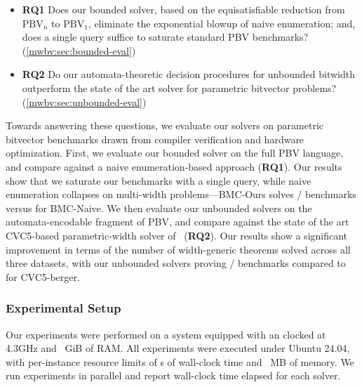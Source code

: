 \begin{itemize}[leftmargin=*]
  \item \textbf{RQ1} Does our bounded solver, based on the equisatisfiable reduction from $\text{PBV}_n$ to $\text{PBV}_1$, eliminate the exponential blowup of
naive enumeration; and, does a single \qfbv{} query suffice to saturate standard PBV benchmarks?
(\cref{mwbv:sec:bounded-eval})

\item \textbf{RQ2} Do our automata-theoretic decision procedures for unbounded
bitwidth outperform the state of the art solver for parametric bitvector problems?
(\cref{mwbv:sec:unbounded-eval})
\end{itemize}
Towards answering
these questions, we evaluate our solvers on parametric bitvector benchmarks drawn
from compiler verification and hardware optimization.
First, we evaluate our bounded solver on the full PBV language,
and compare against a naive enumeration-based approach (\textbf{RQ1}). Our results show that we
saturate our benchmarks with a single \qfbv{} query, while naive enumeration
collapses on multi-width problems---BMC-Ours solves \EverybenchNumSolvedMbmc{}/\EverybenchNumProblemsTotal{} benchmarks versus \EverybenchNumSolvedNbmc{} for BMC-Naive.
We then evaluate our unbounded solvers on the
automata-encodable fragment of PBV, and compare against the state of the art
CVC5-based
parametric-width solver of~\citet{bit-precise-parametric-bv} (\textbf{RQ2}). Our results show
a significant improvement in terms of the number of
width-generic theorems solved across all three datasets, with our unbounded solvers proving \EverybenchNumSolvedMr{}/\EverybenchNumProblemsTotal{} benchmarks compared to \EverybenchNumSolvedC{} for CVC5-berger.


\subsubsection{Experimental Setup}
Our experiments were performed on a system equipped with an \MwSystemSpecsProcessorName{} clocked at 4.3GHz and \MwSystemSpecsMemoryGb{}~GiB of RAM.
All experiments were executed under Ubuntu 24.04, with per-instance resource limits of \MwConfigTimeoutSec{}s of wall-clock time and \MwConfigMemoutMb{}~MB of memory.
We run \MwConfigNproc{} experiments in parallel and report wall-clock time elapsed for each solver.

